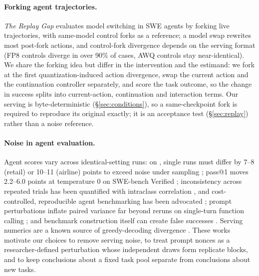 \paragraph{Forking agent trajectories.} \emph{The Replay Gap} \citep{gonuguntla2026replay} evaluates model switching in SWE agents by forking live trajectories, with same-model control forks as a reference; a model swap rewrites most post-fork actions, and control-fork divergence depends on the serving format (FP8 controls diverge in over 90\% of cases, AWQ controls stay near-identical). We share the forking idea but differ in the intervention and the estimand: we fork at the first quantization-induced action divergence, swap the current action and the continuation controller separately, and score the task outcome, so the change in success splits into current-action, continuation and interaction terms. Our serving is byte-deterministic (\S\ref{sec:conditions}), so a same-checkpoint fork is required to reproduce its original exactly; it is an acceptance test (\S\ref{sec:replay}) rather than a noise reference.

\paragraph{Noise in agent evaluation.} Agent scores vary across identical-setting runs: on \tautwo{}, single runs must differ by 7--8 (retail) or 10--11 (airline) points to exceed noise under sampling \citep{tau2issue540}; pass@1 moves 2.2--6.0 points at temperature 0 on SWE-bench Verified \citep{bjarnason2026randomness}; inconsistency across repeated trials has been quantified with intraclass correlation \citep{mustahsan2025stochasticity}, and cost-controlled, reproducible agent benchmarking has been advocated \citep{kapoor2024agentsmatter}; prompt perturbations inflate paired variance far beyond reruns on single-turn function calling \citep{chen2026noisefloor}; and benchmark construction itself can create false successes \citep{zhu2025abc}. Serving numerics are a known source of greedy-decoding divergence \citep{du2026greedy,yuan2025nondeterminism,he2025defeating}. These works motivate our choices to remove serving noise, to treat prompt nonces as a researcher-defined perturbation whose independent draws form replicate blocks, and to keep conclusions about a fixed task pool separate from conclusions about new tasks.
